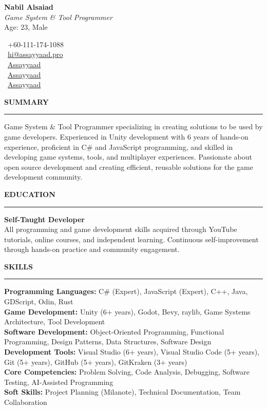 \documentclass[a4paper,10pt]{article}
\newcommand{\sectionheading}[1]{%
  \addvspace{\medskipamount}%
  {\large\bfseries\MakeUppercase{#1}} %
  \noindent\rule{\linewidth}{0.4pt}%
  \vspace{\smallskipamount}%
}
\begin{document}
\begin{minipage}[t]{0.55\textwidth}
    \vspace{0pt} %
    {\Large\bfseries Nabil Alsaiad}\\[4pt]
    \textit{Game System \& Tool Programmer}\\[4pt]
    Age: 23, Male
\end{minipage}%
\hfill %
\begin{minipage}[t]{0.4\textwidth}
    \vspace{0pt} %
    \raggedleft %
    \faPhone\ +60-111-174-1088 \\[4pt]
    \faEnvelope\ \href{mailto:hi@assayyaad.pro}{hi@assayyaad.pro} \\[4pt]
    \faGitlab\ \href{https://gitlab.com/Assayyaad}{Assayyaad} \\[4pt]
    \faGithub\ \href{https://github.com/Assayyaad}{Assayyaad} \\[4pt]
    \faLinkedin\ \href{https://linkedin.com/in/Assayyaad}{Assayyaad}
\end{minipage}

\sectionheading{Summary}
Game System \& Tool Programmer specializing in creating solutions to be used by game developers. Experienced in Unity development with 6 years of hands-on experience, proficient in C\# and JavaScript programming, and skilled in developing game systems, tools, and multiplayer experiences. Passionate about open source development and creating efficient, reusable solutions for the game development community.

\sectionheading{Education}

\textbf{Self-Taught Developer} \\
All programming and game development skills acquired through YouTube tutorials, online courses, and independent learning. Continuous self-improvement through hands-on practice and community engagement.

\sectionheading{Skills}

\textbf{Programming Languages:} C\# (Expert), JavaScript (Expert), C++, Java, GDScript, Odin, Rust \\
\textbf{Game Development:} Unity (6+ years), Godot, Bevy, raylib, Game Systems Architecture, Tool Development \\
\textbf{Software Development:} Object-Oriented Programming, Functional Programming, Design Patterns, Data Structures, Software Design \\
\textbf{Development Tools:} Visual Studio (6+ years), Visual Studio Code (5+ years), Git (5+ years), GitHub (5+ years), GitKraken (3+ years) \\
\textbf{Core Competencies:} Problem Solving, Code Analysis, Debugging, Software Testing, AI-Assisted Programming \\
\textbf{Soft Skills:} Project Planning (Milanote), Technical Documentation, Team Collaboration
\end{document}
